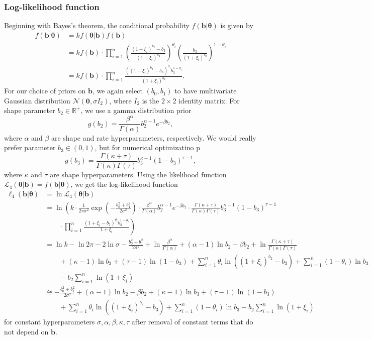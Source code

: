 \documentclass[11pt, letterpaper]{article}
\newcommand{\mbb}[1]{\mathbb{#1}}
\newcommand{\mc}[1]{\mathcal{#1}}
\numberwithin{equation}{section}
\begin{document}
\subsubsection{Log-likelihood function}
Beginning with Bayes's theorem, the conditional probability $f(\bm b | \bm \theta)$ is given by
\begin{align*}
f(\bm b | \bm \theta) &= k f(\bm \theta | \bm b) f(\bm b) \\
&= k f(\bm b) \cdot \prod_{i=1}^n \left( \frac{(1+\xi_i)^{b_2} -b_3}{(1+\xi_i)^{b_2}}\right)^{\theta_i}\left( \frac{b_3}{(1+\xi_i)^{b_2}}\right)^{1-\theta_i}\\
&= k f(\bm b) \cdot \prod_{i=1}^n \frac{\left((1+\xi_i)^{b_2} -b_3\right)^{\theta_i}b_3^{1-\theta_i}}{(1+\xi_i)^{b_2}}.
\end{align*}
For our choice of priors on $\bm b$, we again select $(b_0, b_1)$ to have multivariate Gaussian distribution $\mc N(\bm 0, \sigma I_2)$, where $I_2$ is the $2 \times 2$ identity matrix. For shape parameter $b_2 \in \mbb R^+$, we use a gamma distribution prior 
$$ g(b_2) = \frac{\beta^\alpha}{\Gamma(\alpha)} b_2^{\alpha-1}e^{-\beta b_2},$$
where $\alpha$ and $\beta$ are shape and rate hyperparameters, respectively. We would really prefer parameter $b_3 \in (0,1)$, but for numerical optimizatino p 
$$ g(b_3) = \frac{\Gamma (\kappa+\tau)}{\Gamma(\kappa)\Gamma(\tau)} b_3^{\kappa-1}(1-b_3)^{\tau -1},$$
where  $\kappa$ and $\tau$ are shape hyperparameters.
Using the likelihood function $\mc L_{4}(\bm \theta | \bm b) = f(\bm b | \bm \theta)$, we get the log-likelihood function 
\begin{align*}
\ell_{4}(\bm b | \bm \theta) &= \ln \mc L_{4}(\bm \theta | \bm b) \\
&= \ln \left( k \cdot \frac{1}{2\pi \sigma^2} \exp\left(-\frac{b_0^2+b_1^2}{2 \sigma^2}\right) \cdot  \frac{\beta^\alpha}{\Gamma(\alpha)} b_2^{\alpha-1}e^{-\beta b_2} \cdot \frac{\Gamma (\kappa+\tau)}{\Gamma(\kappa)\Gamma(\tau)} b_3^{\kappa-1}(1-b_3)^{\tau -1} \right. \\
&\qquad \cdot \left. \prod_{i=1}^n \frac{\left(1+\xi_i -b_2\right)^{\theta_i}b_2^{1-\theta_i}}{1+\xi_i}\right) \\
&= \ln k - \ln 2\pi -2 \ln \sigma - \frac{b_0^2 + b_1^2}{2\sigma^2} + \ln \frac{\beta^\alpha}{\Gamma(\alpha)} + (\alpha-1)\ln b_2 -\beta b_2 + \ln \frac{\Gamma(\kappa + \tau)}{\Gamma(\kappa)\Gamma(\tau)} \\
&\qquad  + (\kappa-1)\ln b_3 + (\tau-1)\ln(1-b_3) + \sum_{i=1}^n \theta_i \ln\left( (1 + \xi_i)^{b_2} -b_3\right) + \sum_{i=1}^n (1-\theta_i)\ln b_3 \\
&\qquad - b_2\sum_{i=1}^n \ln(1+\xi_i) \\
&\cong - \frac{b_0^2 + b_1^2}{2\sigma^2} + (\alpha-1)\ln b_2 -\beta b_2 + 
(\kappa-1)\ln b_3 + (\tau-1)\ln(1-b_3) \\
&\qquad + \sum_{i=1}^n \theta_i \ln\left( (1 + \xi_i)^{b_2} -b_3\right) + \sum_{i=1}^n (1-\theta_i)\ln b_3 - b_2\sum_{i=1}^n \ln(1+\xi_i)
\end{align*}
for constant hyperparameters $\sigma, \alpha, \beta, \kappa, \tau$ after removal of constant terms that do not depend on $\bm b$. 
\end{document}

